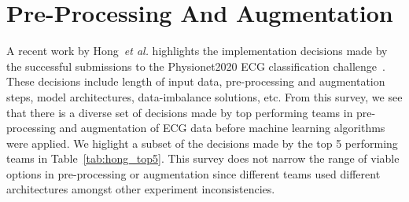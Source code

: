 \documentclass{article}
\begin{document}

\section{Pre-Processing And Augmentation}
\label{sec:processing}

A recent work by Hong~\textit{et al.} highlights the implementation decisions made by the successful submissions to the Physionet2020 ECG classification challenge~\cite{hong2022practical}. These decisions include length of input data, pre-processing and augmentation steps, model architectures, data-imbalance solutions, etc. From this survey, we see that there is a diverse set of decisions made by top performing teams in pre-processing and augmentation of ECG data before machine learning algorithms were applied. We higlight a subset of the decisions made by the top 5 performing teams in Table~\ref{tab:hong_top5}.  This survey does not narrow the range of viable options in pre-processing or augmentation since different teams used different architectures amongst other experiment inconsistencies. 
\end{document}

